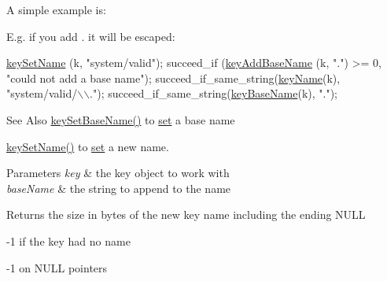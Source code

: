 A simple example is\-: 
 E.\-g. if you add . it will be escaped\-: 
\begin{DoxyCodeInclude}
\hyperlink{group__keyname_ga7699091610e7f3f43d2949514a4b35d9}{keySetName} (k, \textcolor{stringliteral}{"system/valid"});
succeed\_if (\hyperlink{group__keyname_gaa942091fc4bd5c2699e49ddc50829524}{keyAddBaseName} (k, \textcolor{stringliteral}{"."}) >= 0, \textcolor{stringliteral}{"could not add a base
       name"});
succeed\_if\_same\_string(\hyperlink{group__keyname_ga8e805c726a60da921d3736cda7813513}{keyName}(k), \textcolor{stringliteral}{"system/valid/\(\backslash\)\(\backslash\)."});
succeed\_if\_same\_string(\hyperlink{group__keyname_gaaff35e7ca8af5560c47e662ceb9465f5}{keyBaseName}(k), \textcolor{stringliteral}{"."});
\end{DoxyCodeInclude}
 \begin{DoxySeeAlso}{See Also}
\hyperlink{group__keyname_ga6e804bd453f98c28b0ff51430d1df407}{key\-Set\-Base\-Name()} to \hyperlink{classkdb_1_1Key_a615124f0a2b291e03975b49c233654d7}{set} a base name 

\hyperlink{group__keyname_ga7699091610e7f3f43d2949514a4b35d9}{key\-Set\-Name()} to \hyperlink{classkdb_1_1Key_a615124f0a2b291e03975b49c233654d7}{set} a new name.
\end{DoxySeeAlso}

\begin{DoxyParams}{Parameters}
{\em key} & the key object to work with \\
\hline
{\em base\-Name} & the string to append to the name \\
\hline
\end{DoxyParams}
\begin{DoxyReturn}{Returns}
the size in bytes of the new key name including the ending N\-U\-L\-L 

-\/1 if the key had no name 

-\/1 on N\-U\-L\-L pointers 
\end{DoxyReturn}

